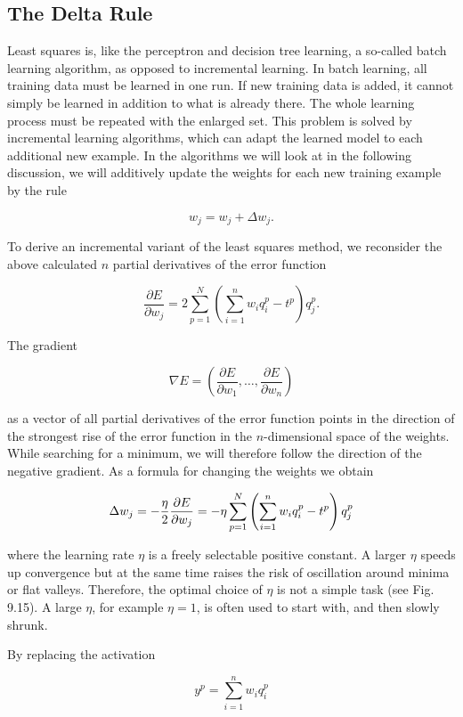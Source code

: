 \documentclass[10pt]{book}
\begin{document}
\subsection{The Delta Rule}
Least squares is, like the perceptron and decision tree learning, a so-called batch learning algorithm, as opposed to incremental learning. In batch learning, all training data must be learned in one run. If new training data is added, it cannot simply be learned in addition to what is already there. The whole learning process must be repeated with the enlarged set. This problem is solved by incremental learning algorithms, which can adapt the learned model to each additional new example. In the algorithms we will look at in the following discussion, we will additively update the weights for each new training example by the rule

$$
w_{j}=w_{j}+\Delta w_{j} .
$$

To derive an incremental variant of the least squares method, we reconsider the above calculated $n$ partial derivatives of the error function

$$
\frac{\partial E}{\partial w_{j}}=2 \sum_{p=1}^{N}\left(\sum_{i=1}^{n} w_{i} q_{i}^{p}-t^{p}\right) q_{j}^{p} .
$$

The gradient

$$
\nabla E=\left(\frac{\partial E}{\partial w_{1}}, \ldots, \frac{\partial E}{\partial w_{n}}\right)
$$

as a vector of all partial derivatives of the error function points in the direction of the strongest rise of the error function in the $n$-dimensional space of the weights. While searching for a minimum, we will therefore follow the direction of the negative gradient. As a formula for changing the weights we obtain

$$
\Delta w_{j}=-\frac{\eta}{2} \frac{\partial E}{\partial w_{j}}=-\eta \sum_{p=1}^{N}\left(\sum_{i=1}^{n} w_{i} q_{i}^{p}-t^{p}\right) q_{j}^{p}\index{Backpropagation!learning rule}\index{Delta rule!generalized}\index{Hebb rule}
$$

where the learning rate $\eta$ is a freely selectable positive constant. A larger $\eta$ speeds up convergence but at the same time raises the risk of oscillation around minima or flat valleys. Therefore, the optimal choice of $\eta$ is not a simple task (see Fig. 9.15). A large $\eta$, for example $\eta=1$, is often used to start with, and then slowly shrunk.

By replacing the activation

$$
y^{p}=\sum_{i=1}^{n} w_{i} q_{i}^{p}
$$
\end{document}
